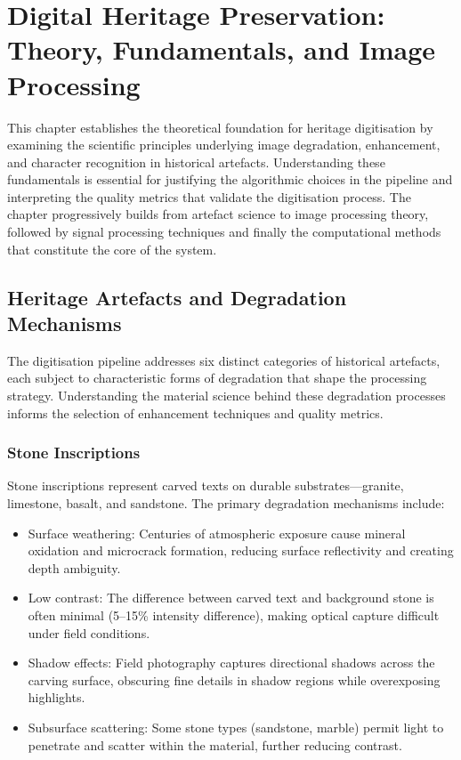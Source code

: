 \chapter{Digital Heritage Preservation: Theory, Fundamentals, and Image Processing}

This chapter establishes the theoretical foundation for heritage digitisation by examining the scientific principles underlying image degradation, enhancement, and character recognition in historical artefacts. Understanding these fundamentals is essential for justifying the algorithmic choices in the pipeline and interpreting the quality metrics that validate the digitisation process. The chapter progressively builds from artefact science to image processing theory, followed by signal processing techniques and finally the computational methods that constitute the core of the system.

\section{Heritage Artefacts and Degradation Mechanisms}

The digitisation pipeline addresses six distinct categories of historical artefacts, each subject to characteristic forms of degradation that shape the processing strategy. Understanding the material science behind these degradation processes informs the selection of enhancement techniques and quality metrics.

\subsection{Stone Inscriptions}

Stone inscriptions represent carved texts on durable substrates—granite, limestone, basalt, and sandstone. The primary degradation mechanisms include:

\begin{itemize}
	\item Surface weathering: Centuries of atmospheric exposure cause mineral oxidation and microcrack formation, reducing surface reflectivity and creating depth ambiguity.
	\item Low contrast: The difference between carved text and background stone is often minimal (5–15\% intensity difference), making optical capture difficult under field conditions.
	\item Shadow effects: Field photography captures directional shadows across the carving surface, obscuring fine details in shadow regions while overexposing highlights.
	\item Subsurface scattering: Some stone types (sandstone, marble) permit light to penetrate and scatter within the material, further reducing contrast.
\end{itemize}

